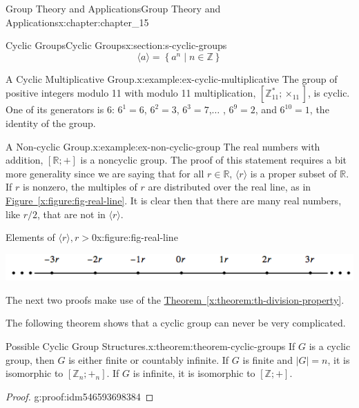 \documentclass[oneside,10pt,]{book}
\newcommand{\xreffont}{\relax}
\numberwithin{equation}{section}
\begin{document}
\begin{chapterptx}{Group Theory and Applications}{}{Group Theory and Applications}{}{}{x:chapter:chapter_15}
\begin{sectionptx}{Cyclic Groups}{}{Cyclic Groups}{}{}{x:section:s-cyclic-groups}
\begin{equation*}
\langle a \rangle = \left\{a^n \mid n \in  \mathbb{Z}\right\}
\end{equation*}
%
\begin{example}{A Cyclic Multiplicative Group.}{x:example:ex-cyclic-multiplicative}%
The group of positive integers modulo 11 with modulo 11 multiplication, \([\mathbb{Z}_{11}^* ;\times_{11}]\), is cyclic. One of its generators is 6:  \(6^1 = 6\), \(6^2 = 3\), \(6^3= 7\),\(\ldots\) , \(6^9=2\), and \(6^{10}=1\), the identity of the group.%
\end{example}
\begin{example}{A Non-cyclic Group.}{x:example:ex-non-cyclic-group}%
The real numbers with addition, \([\mathbb{R};+]\) is a noncyclic group. The proof of this statement requires a bit more generality since we are saying that for all  \(r \in  \mathbb{R}\), \(\langle r \rangle\) is a proper subset of \(\mathbb{R}\). If \(r\) is nonzero, the multiples of \(r\) are distributed over the real line, as in \hyperref[x:figure:fig-real-line]{Figure~{\xreffont\ref{x:figure:fig-real-line}}}. It is clear then that there are many real numbers, like \(r/2\), that are not in \(\langle r \rangle\).%
\begin{figureptx}{Elements of \(\langle r \rangle, r > 0\)}{x:figure:fig-real-line}{}%
\begin{image}{0.1}{0.8}{0.1}%
\includegraphics[width=\linewidth]{images/fig-real-line.png}
\end{image}%
\tcblower
\end{figureptx}%
\end{example}
The next two proofs  make use of the \hyperref[x:theorem:th-division-property]{Theorem~{\xreffont\ref{x:theorem:th-division-property}}}.%
\par
The following theorem shows that a cyclic group can never be very complicated.%
\begin{theorem}{Possible Cyclic Group Structures.}{}{x:theorem:theorem-cyclic-groups}%
If \(G\) is a cyclic group, then \(G\) is either finite or countably infinite. If \(G\) is finite and \(\lvert G\rvert=n\), it is isomorphic to \([\mathbb{Z}_n; +_n]\). If \(G\) is infinite, it is isomorphic to \([\mathbb{Z};+]\).%
\end{theorem}
\begin{proof}{}{g:proof:idm546593698384}

\end{proof}
\end{sectionptx}
\end{chapterptx}
\end{document}

